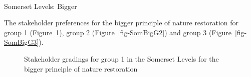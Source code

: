 \documentclass[
  12pt,
  letterpaper,
  DIV=11,
  numbers=noendperiod]{scrartcl}
\makeatletter
\let\oldparagraph\paragraph
\renewcommand{\paragraph}{
    \@ifstar
      \xxxParagraphStar
      \xxxParagraphNoStar
  }
\newcommand{\xxxParagraphStar}[1]{\oldparagraph*{#1}\mbox{}}
\newcommand{\xxxParagraphNoStar}[1]{\oldparagraph{#1}\mbox{}}
\makeatother
\begin{document}
\newpage{}

\paragraph{Somerset Levels: Bigger}\label{somerset-levels-bigger}

The stakeholder preferences for the bigger principle of nature
restoration for group 1 (Figure~\ref{fig-SomBigG1}), group 2
(Figure~\ref{fig-SomBigG2}) and group 3 (Figure~\ref{fig-SomBigG3}).

\begin{figure}[H]


\caption{\label{fig-SomBigG1}Stakeholder gradings for group 1 in the
Somerset Levels for the bigger principle of nature restoration}

\end{figure}%
\end{document}
